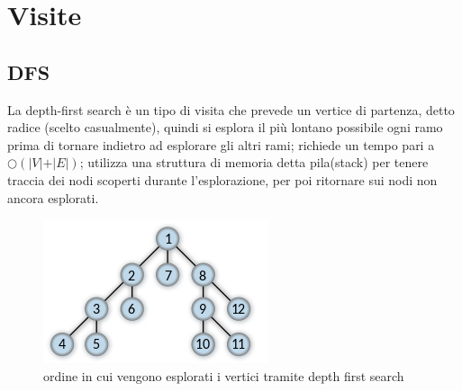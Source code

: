 \documentclass[12pt,a4paper]{article}
\begin{document}
\pagebreak
\section{Visite}

\subsection{DFS}
La depth-first search è un tipo di visita che prevede un vertice di partenza, detto radice (scelto casualmente), quindi si esplora il più lontano possibile ogni ramo prima di tornare indietro ad esplorare gli altri rami; richiede un tempo pari a $\bigcirc(\vert V \vert + \vert E \vert)$; utilizza una struttura di memoria detta pila(stack) per tenere traccia dei nodi scoperti durante l'esplorazione, per poi ritornare sui nodi non ancora esplorati.
\begin{figure}[h]
	\centering
	\includegraphics[width=0.7\linewidth]{img/Depth-first-tree.svg.png}
	\caption{ordine in cui vengono esplorati i vertici tramite depth first search}
	\label{fig:5}
\end{figure}
\end{document}
